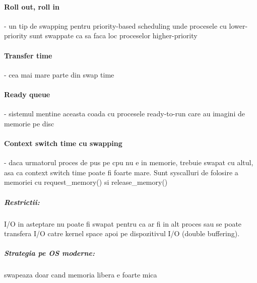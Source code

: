 \documentclass{article}
\begin{document}
\paragraph*{Roll out, roll in} - un tip de swapping pentru priority-based scheduling unde procesele cu lower-priority sunt swappate ca sa faca loc proceselor higher-priority
\paragraph*{Transfer time} - cea mai mare parte din swap time
\paragraph*{Ready queue} - sistemul mentine aceasta coada cu procesele ready-to-run care au imagini de memorie pe disc

\paragraph*{Context switch time cu swapping} - daca urmatorul proces de pus pe cpu nu e in memorie, trebuie swapat cu altul, asa ca context switch time poate fi foarte mare. Sunt syscalluri de folosire a memoriei cu request\_memory() si release\_memory()
\subparagraph*{Restrictii:} I/O in asteptare nu poate fi swapat pentru ca ar fi in alt proces sau se poate transfera I/O catre kernel space apoi pe dispozitivul I/O (double buffering).
\subparagraph*{Strategia pe OS moderne:} swapeaza doar cand memoria libera e foarte mica
\end{document}
